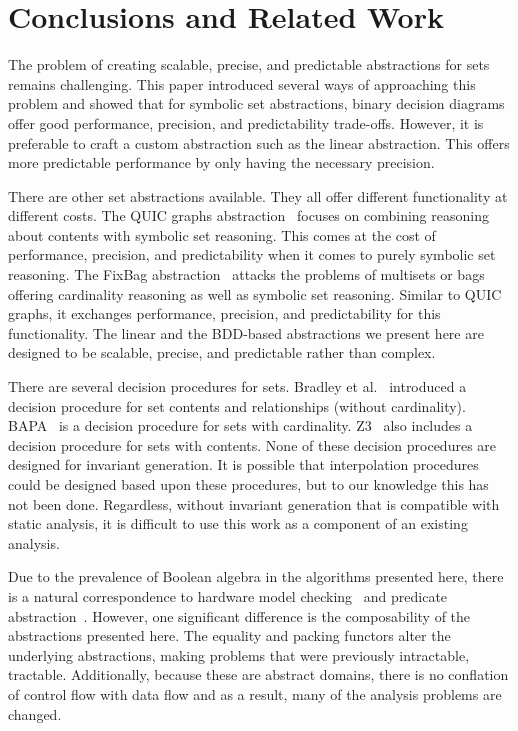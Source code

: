 \section{Conclusions and Related Work}
The problem of creating scalable, precise, and predictable abstractions for sets remains challenging.  This paper introduced several ways of approaching this problem and showed that for symbolic set abstractions, binary decision diagrams offer good performance, precision, and predictability trade-offs.  However, it is preferable to craft a custom abstraction such as the linear abstraction.  This offers more predictable performance by only having the necessary precision.

There are other set abstractions available.
They all offer different functionality at different costs.
The QUIC graphs abstraction~\cite{ab:ecoop:13,quicr:cav:14} focuses on
combining reasoning about contents with symbolic set reasoning.
This comes at the cost of performance, precision, and predictability
when it comes to purely symbolic set reasoning.
The FixBag abstraction~\cite{fixbag:cav:11} attacks the problems of
multisets or bags offering cardinality reasoning as well as symbolic
set reasoning.
Similar to QUIC graphs, it exchanges performance, precision, and
predictability for this functionality.
The linear and the BDD-based abstractions we present here are designed
to be scalable, precise, and predictable rather than complex.

There are several decision procedures for sets.  Bradley et al.~\cite{bradley:vmcai:06} introduced a decision procedure for set contents and relationships (without cardinality).  BAPA~\cite{knr:jar:06,jahob:thesis:07} is a decision procedure for sets with cardinality.  Z3~\cite{mb:tacas:08} also includes a decision procedure for sets with contents.  None of these decision procedures are designed for invariant generation.  It is possible that interpolation procedures~\cite{interp:cav:03} could be designed based upon these procedures, but to our knowledge this has not been done.  Regardless, without invariant generation that is compatible with static analysis, it is difficult to use this work as a component of an existing analysis.

Due to the prevalence of Boolean algebra in the algorithms presented here, there is a natural correspondence to hardware model checking~\cite{mc:toplas:86} and predicate abstraction~\cite{sympred:cav:03}.  However, one significant difference is the composability of the abstractions presented here.  The equality and packing functors alter the underlying abstractions, making problems that were previously intractable, tractable.  Additionally, because these are abstract domains, there is no conflation of control flow with data flow and as a result, many of the analysis problems are changed.

